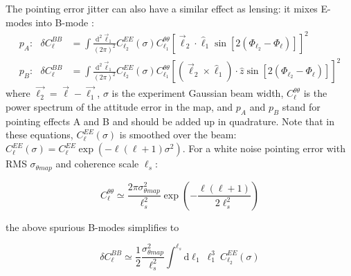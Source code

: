 The pointing error jitter can also have a similar effect as lensing: it mixes E-modes into B-mode \cite{hu03}:
\begin{align} 
\label{eq: bmodes from attitude errors pa}
p_A: \,\,\,\, \delta C_{\ell}^{BB} &= \int \frac{\mathrm{d^2} \vec{{\ell}}_1}{(2\pi)^2}   C^{EE}_{{\ell}_2}(\sigma) C^{\theta \theta}_{{\ell}_1} [\vec{{\ell}}_2 \cdot              \hat{{\ell}}_1 \sin[2(\Phi_{{\ell}_2} - \Phi_{\ell})]]^2 \\
\label{eq: bmodes from attitude errors pb}
p_B: \,\,\,\, \delta C_{\ell}^{BB} &= \int \frac{\mathrm{d^2} \vec{{\ell}}_1}{(2\pi)^2}   C^{EE}_{{\ell}_2}(\sigma) C^{\theta \theta}_{{\ell}_1} [(\vec{{\ell}}_2 \times            \hat{{\ell}}_1) \cdot \hat{z} \sin[2(\Phi_{{\ell}_2} - \Phi_{\ell})]]^2 
\end{align}
\noindent where  $\vec{{\ell}_2} = \vec{{\ell}} - \vec{{\ell}_1}$, $\sigma$ is the experiment Gaussian beam width, $C_{\ell}^{\theta \theta}$ is the power spectrum of the      attitude error in the map, and $p_A$ and $p_B$ stand for pointing effects A and B and should be added up in quadrature.
Note that in these equations, $C_{\ell}^{EE}(\sigma)$ is smoothed over the beam:  $C^{EE}_{\ell}(\sigma) = C^{EE}_{\ell} \exp{(-{\ell}({\ell}+1)\sigma^2)}$.
For a white noise pointing error with RMS $\sigma_{\theta map}$ and coherence scale $\ell_s$:

\begin{equation}
 C^{\theta \theta}_{\ell} \simeq \frac{2\pi\sigma_{\theta map}^2}{{\ell}_s^2}\exp(-\frac{{\ell}({\ell}+1)}{2{\ell}_s^2})
\end{equation}

\noindent the above spurious B-modes simplifies to

\begin{equation}
\delta  C_{\ell}^{BB} \simeq  \frac{1}{2}\frac{\sigma_{\theta map}^2}{{\ell}_s^2}         \int^{{\ell}_s} \mathrm{d}{\ell}_1 \ {\ell}_1^3 \ C^{EE}_{{\ell}_2}(\sigma)
\end{equation}


